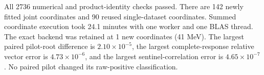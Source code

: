 All 2736 numerical and product-identity checks passed. There are 142 newly fitted joint coordinates and 90 reused single-dataset coordinates. Summed coordinate execution took 24.1 minutes with one worker and one BLAS thread. The exact backend was retained at 1 new coordinates (41 MeV). The largest paired pilot-root difference is $2.10\times10^{-5}$, the largest complete-response relative vector error is $4.73\times10^{-6}$, and the largest sentinel-correlation error is $4.65\times10^{-7}$. No paired pilot changed its raw-positive classification.
